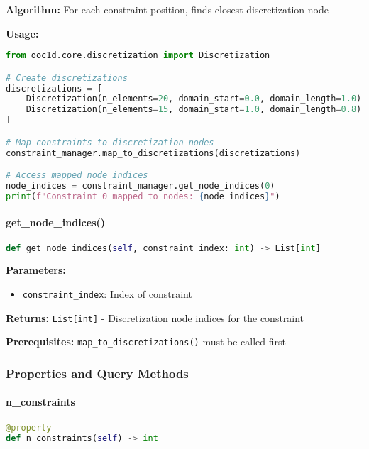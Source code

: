 \textbf{Algorithm:} For each constraint position, finds closest discretization node

\textbf{Usage:}
\begin{lstlisting}[language=Python, caption=Map to Discretizations Usage]
from ooc1d.core.discretization import Discretization

# Create discretizations
discretizations = [
    Discretization(n_elements=20, domain_start=0.0, domain_length=1.0),
    Discretization(n_elements=15, domain_start=1.0, domain_length=0.8)
]

# Map constraints to discretization nodes
constraint_manager.map_to_discretizations(discretizations)

# Access mapped node indices
node_indices = constraint_manager.get_node_indices(0)
print(f"Constraint 0 mapped to nodes: {node_indices}")
\end{lstlisting}

\paragraph{get\_node\_indices()}\leavevmode
\begin{lstlisting}[language=Python, caption=Get Node Indices Method]
def get_node_indices(self, constraint_index: int) -> List[int]
\end{lstlisting}

\textbf{Parameters:}
\begin{itemize}
    \item \texttt{constraint\_index}: Index of constraint
\end{itemize}

\textbf{Returns:} \texttt{List[int]} - Discretization node indices for the constraint

\textbf{Prerequisites:} \texttt{map\_to\_discretizations()} must be called first

\subsubsection{Properties and Query Methods}

\paragraph{n\_constraints}\leavevmode
\begin{lstlisting}[language=Python, caption=Number of Constraints Property]
@property
def n_constraints(self) -> int
\end{lstlisting}

